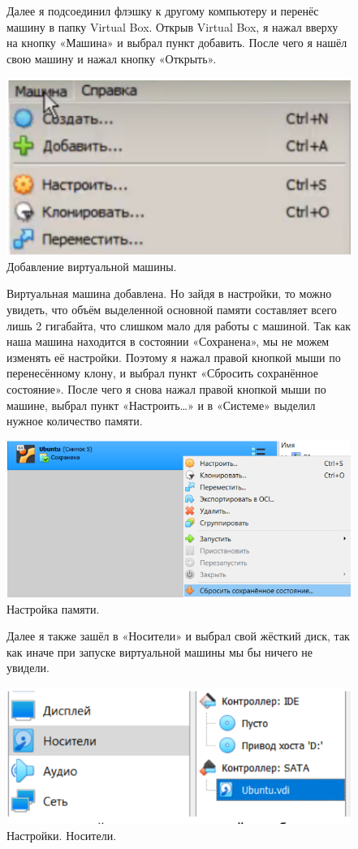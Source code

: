 \documentclass[oneside,final,12pt]{extarticle} %
\begin{document}
\begin{figure}
\quad Далее я подсоединил флэшку к другому компьютеру и перенёс машину в папку Virtual Box. Открыв Virtual Box, я нажал вверху на кнопку «Машина» и выбрал пункт добавить. После чего я нашёл свою машину и нажал кнопку «Открыть».

		\centering
		\includegraphics[width=0.4\linewidth]{img/9.png}
\caption{Добавление виртуальной машины.}
\label{ris:image}
\end{figure}

\begin{figure}
\quad Виртуальная машина добавлена. Но зайдя в настройки, то можно увидеть, что объём выделенной основной памяти составляет всего лишь 2 гигабайта, что слишком мало для работы с машиной. Так как наша машина находится в состоянии «Сохранена», мы не можем изменять её настройки. Поэтому я нажал правой кнопкой мыши по перенесённому клону, и выбрал пункт «Сбросить сохранённое состояние». После чего я снова нажал правой кнопкой мыши по машине, выбрал пункт «Настроить…» и в «Системе» выделил нужное количество памяти.

		\centering
		\includegraphics[width=0.65\linewidth]{img/10.png}
\caption{Настройка памяти.}
\label{ris:image}
\end{figure}

\begin{figure}
\quad Далее я также зашёл в «Носители» и выбрал свой жёсткий диск, так как иначе при запуске виртуальной машины мы бы ничего не увидели.

		\centering
		\includegraphics[width=0.65\linewidth]{img/11.png}
\caption{Настройки. Носители.}
\label{ris:image}

\end{figure}
\end{document}
